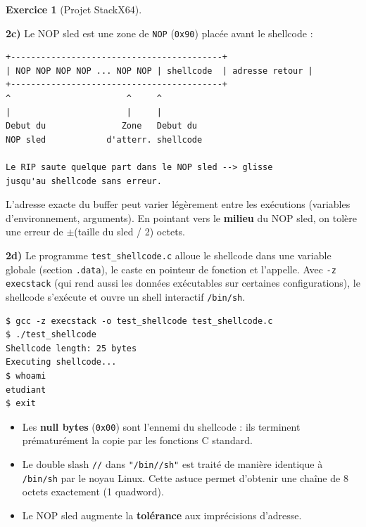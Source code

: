 \documentclass[a4paper,11pt]{article}
\theoremstyle{plain}
\theoremstyle{definition}
\newtheorem{exercice}{Exercice}
\begin{document}
\begin{exercice}[Projet StackX64]
\begin{correction}
\textbf{2c)} Le NOP sled est une zone de \texttt{NOP} (\texttt{0x90}) placée avant le shellcode :
\begin{lstlisting}[style=GDBStyle]
+------------------------------------------+
| NOP NOP NOP NOP ... NOP NOP | shellcode  | adresse retour |
+------------------------------------------+
^                       ^     ^
|                       |     |
Debut du               Zone   Debut du
NOP sled            d'atterr. shellcode

Le RIP saute quelque part dans le NOP sled --> glisse
jusqu'au shellcode sans erreur.
\end{lstlisting}

L'adresse exacte du buffer peut varier légèrement entre les exécutions (variables d'environnement, arguments). En pointant vers le \textbf{milieu} du NOP sled, on tolère une erreur de $\pm$(taille du sled / 2) octets.

\textbf{2d)} Le programme \texttt{test\_shellcode.c} alloue le shellcode dans une variable globale (section \texttt{.data}), le caste en pointeur de fonction et l'appelle. Avec \texttt{-z execstack} (qui rend aussi les données exécutables sur certaines configurations), le shellcode s'exécute et ouvre un shell interactif \texttt{/bin/sh}.

\begin{lstlisting}[style=GDBStyle]
$ gcc -z execstack -o test_shellcode test_shellcode.c
$ ./test_shellcode
Shellcode length: 25 bytes
Executing shellcode...
$ whoami
etudiant
$ exit
\end{lstlisting}

\begin{pointcle}
\begin{itemize}
    \item Les \textbf{null bytes} (\texttt{0x00}) sont l'ennemi du shellcode : ils terminent prématurément la copie par les fonctions C standard.
    \item Le double slash \texttt{//} dans \texttt{"/bin//sh"} est traité de manière identique à \texttt{/bin/sh} par le noyau Linux. Cette astuce permet d'obtenir une chaîne de 8 octets exactement (1 quadword).
    \item Le NOP sled augmente la \textbf{tolérance} aux imprécisions d'adresse.
\end{itemize}
\end{pointcle}

\end{correction}




\end{exercice}
\end{document}
